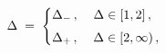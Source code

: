 \begin{equation}
  \Delta  \;=\;
   \begin{cases} \Delta_- \,,  \;\;\;\; \Delta \in [1,2]\,,
                                                   &   \cr
           \noalign{\vskip 4pt}
         \Delta_+ \,, \;\;\;\;  \Delta \in [2,\infty )\,,  
                                                   &    \cr
 \end{cases}
   \label{f_grav}
\end{equation}

